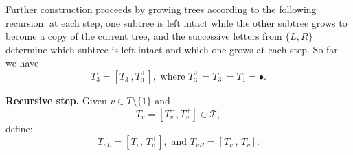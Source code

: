 \documentclass[10pt]{amsart}
\theoremstyle{definition}
\numberwithin{equation}{section}
\newcommand{\E}{\mathcal{E}}
\newcommand{\TT}{\mathcal{T}}
\begin{document}
 Further construction proceeds by growing trees according to the following recursion: at each step, one subtree is left intact while the other subtree grows to become a copy of the current tree, and the 
successive letters from $\{L,R\}$ determine which subtree  is left intact and which one grows at each step. So far we have 
$$T_3=[T_3^-,T_3^+],\mbox{ where }T_3^+=T_3^-=T_1=\bullet.$$




\textbf{Recursive step.} 
Given $v\in T\setminus\{1\}$ and
$$T_v = [T_v^-, T_v^+] \in \TT,$$ define:
\begin{equation}\label{td}
T_{vL} = [T_v,\, T_v^+],\mbox{ and }T_{vR} = [T_v^-,\, T_v].
\end{equation}
\end{document}
